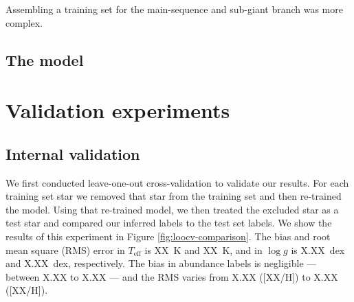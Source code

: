 \documentclass[preprint,trackchanges]{aastex}
\newcommand{\teff}{T_{\mathrm{eff}}}
\newcommand{\logg}{\log g}
\begin{document}
Assembling a training set for the main-sequence and sub-giant branch was more complex.













\subsection{The model}
\label{sec:the-model}


\section{Validation experiments}
\label{sec:validation}


\subsection{Internal validation}
We first conducted leave-one-out cross-validation to validate our results.
For each training set star we removed that star from the training set and
then re-trained the model.  Using that re-trained model, we then treated
the excluded star as a test star and compared our inferred labels to the
test set labels.  We show the results of this experiment in Figure
\ref{fig:loocv-comparison}.  The bias and root mean square (RMS) error in 
$\teff$ is XX~K and XX~K, and in $\logg$ is X.XX~dex and X.XX~dex,
respectively.  The bias in abundance labels is negligible --- between
X.XX to X.XX --- and the RMS varies from X.XX ([XX/H]) to X.XX ([XX/H]).
\end{document}
